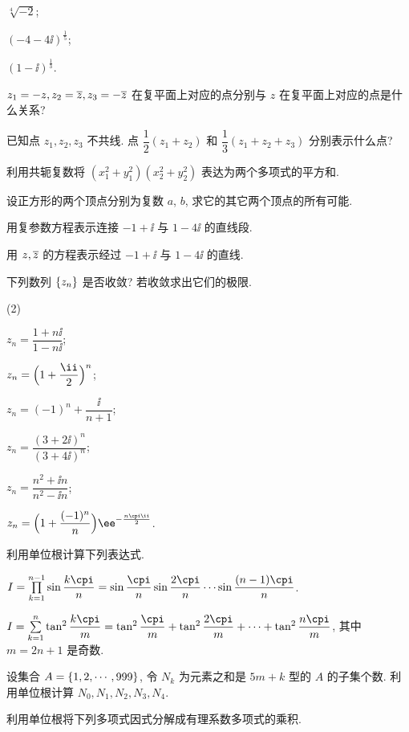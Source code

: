 \begin{homework}
\begin{homework}
\begin{subhomework}
      \item $\sqrt[4]{-2}$;
      \item $(-4-4\ii)^{\frac15}$;
      \item $(1-\ii)^{\frac13}$.
    \end{subhomework}
    \item $z_1=-z,z_2=\overline z,z_3=-\overline{z}$ 在复平面上对应的点分别与 $z$ 在复平面上对应的点是什么关系?
    \item 已知点 $z_1,z_2,z_3$ 不共线. 点 $\dfrac12(z_1+z_2)$ 和 $\dfrac13(z_1+z_2+z_3)$ 分别表示什么点?
    \item 利用共轭复数将 $(x_1^2+y_1^2)(x_2^2+y_2^2)$ 表达为两个多项式的平方和.
    \item 设正方形的两个顶点分别为复数 $a$, $b$, 求它的其它两个顶点的所有可能.
    \item 用复参数方程表示连接 $-1+\ii$ 与 $1-4\ii$ 的直线段.
    \item 用 $z,\overline z$ 的方程表示经过 $-1+\ii$ 与 $1-4\ii$ 的直线.
    \item 下列数列 ${\left\{z_n\right\}}$ 是否收敛? 若收敛求出它们的极限.
    \begin{subhomework}(2)
      \item $z_n=\dfrac{1+n\ii}{1-n\ii}$;
      \item $z_n=\Bigl(1+\dfrac \ii2\Bigr)^n$;
      \item $z_n=(-1)^n+\dfrac{\ii}{n+1}$;
      \item $z_n=\dfrac{(3+2\ii)^n}{(3+4\ii)^n}$;
      \item $z_n=\dfrac{n^2+\ii n}{n^2-\ii n}$;
      \item $z_n=\Bigl(1+\dfrac{(-1)^n}n\Bigr)\ee^{-\frac{n\cpi \ii}2}$.
    \end{subhomework}
    \item \optionalex 利用单位根计算下列表达式.
      \begin{subhomework}
        \item $I=\prod\limits_{k=1}^{n-1}\sin\dfrac{k\cpi}n=\sin\dfrac{\cpi}n\sin\dfrac{2\cpi}n \cdots \sin\dfrac{(n-1)\cpi}n$.
        \item $I=\sum\limits_{k=1}^n\tan^2\dfrac{k\cpi}m=\tan^2\dfrac{\cpi}m+\tan^2\dfrac{2\cpi}m+\cdots+\tan^2\dfrac{n\cpi}m$, 其中 $m=2n+1$ 是奇数.
      \end{subhomework} 
    \item \optionalex 设集合 $A={\left\{1,2,\cdots,999\right\}}$, 令 $N_k$ 为元素之和是 $5m+k$ 型的 $A$ 的子集个数. 利用单位根计算 $N_0,N_1,N_2,N_3,N_4$.
    \item \optionalex 利用单位根将下列多项式因式分解成有理系数多项式的乘积.

\end{homework}
\end{homework}
